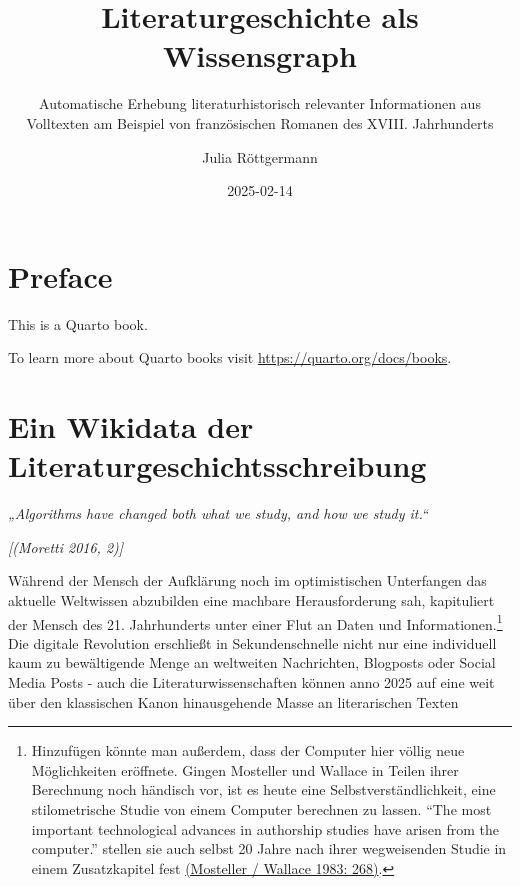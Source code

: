 \documentclass[
  letterpaper,
  DIV=11,
  numbers=noendperiod]{scrreprt}
\title{Literaturgeschichte als Wissensgraph}
\subtitle{Automatische Erhebung literaturhistorisch relevanter
Informationen aus Volltexten am Beispiel von französischen Romanen des
XVIII. Jahrhunderts}
\author{Julia Röttgermann}
\date{2025-02-14}
\renewcommand*\contentsname{Table of contents}
\newcommand\contentsname{Table of contents}
\begin{document}
\maketitle

\renewcommand*\contentsname{Table of contents}
{
\hypersetup{linkcolor=}
\setcounter{tocdepth}{2}
\tableofcontents
}


\chapter*{Preface}\label{preface}


This is a Quarto book.

To learn more about Quarto books visit
\url{https://quarto.org/docs/books}.


\chapter{Ein Wikidata der
Literaturgeschichtsschreibung}\label{ein-wikidata-der-literaturgeschichtsschreibung}

\emph{„Algorithms have changed both what we study, and how we study
it.``}

\emph{{[}(Moretti 2016, 2){]}}

Während der Mensch der Aufklärung noch im optimistischen Unterfangen das
aktuelle Weltwissen abzubilden eine machbare Herausforderung sah,
kapituliert der Mensch des 21. Jahrhunderts unter einer Flut an Daten
und Informationen.\footnote{Hinzufügen könnte man außerdem, dass der
  Computer hier völlig neue Möglichkeiten eröffnete. Gingen Mosteller
  und Wallace in Teilen ihrer Berechnung noch händisch vor, ist es heute
  eine Selbstverständlichkeit, eine stilometrische Studie von einem
  Computer berechnen zu lassen. ``The most important technological
  advances in authorship studies have arisen from the computer.''
  stellen sie auch selbst 20 Jahre nach ihrer wegweisenden Studie in
  einem Zusatzkapitel fest
  \href{https://www.zotero.org/google-docs/?0tygyZ}{(Mosteller / Wallace
  1983: 268)}.} Die digitale Revolution erschließt in Sekundenschnelle
nicht nur eine individuell kaum zu bewältigende Menge an weltweiten
Nachrichten, Blogposts oder Social Media Posts - auch die
Literaturwissenschaften können anno 2025 auf eine weit über den
klassischen Kanon hinausgehende Masse an literarischen Texten
\end{document}
